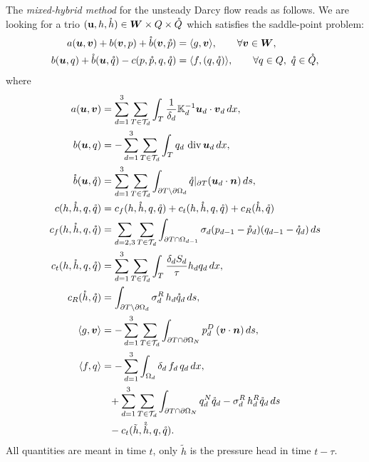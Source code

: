 The \emph{mixed-hybrid method} for the unsteady Darcy flow reads as follows.
We are looking for a trio $(\mathbf{u},h,\mathring h)  
\in \mathbf{\boldsymbol{W}}\times Q\times\mathring Q$ which satisfies the saddle-point problem:
\begin{align}
    a(\vc u,\vc v)  +b(\vc v, p) + \mr b(\vc v, \mr p)
        &=\langle g,\vc v \rangle, \qquad\forall \vc v\in \vc W,
        \label{eq:hybrid-frac-1}\\
    b(\vc u, q ) + \mr b( \vc u, \mr q) - c(p, \mr p, q, \mr q)
        &= \langle f, (q,\mr q) \rangle,
        \qquad\forall q\in Q,\ \mr q\in \mr Q, 
        \label{eq:hybrid-frac-2}
\end{align}
where
\begin{align}
    \label{eq:weak_term_a}
    a(\vc u, \vc v) &= \sum_{d=1}^{3}\sum_{T\in \mathcal T_d}
    \int_{T} \frac{1}{\delta_{d}}\tn K_{d}^{-1} 
    \vc u_d\cdot \vc v_d\,dx,
    \\
    \label{eq:weak_term_b}
    b(\vc u, q)  &= -\sum_{d=1}^{3}\sum_{T\in \mathcal T_d}
    \int_{T} q_d\,\div \vc u_d\,dx,
    \\
    \label{eq:weak_term_bf}
    \mr b(\vc u, \mr q)   &= \sum_{d=1}^{3}\sum_{T\in \mathcal T_d}
    \int_{\partial T\setminus\partial\Omega_{d}}
        \mr q|_{\partial T} ( \vc u_d\cdot\vc n)\,ds,
    \\
    \label{eq:weak_term c}
    c(h, \mr h, q, \mr q) &= c_f(h, \mr h, q, \mr q) 
    + c_t(h, \mr h, q, \mr q) + c_R(\mr h, \mr q)
    \\
    c_f(h, \mr h, q, \mr q)&=\sum_{d=2,3}\sum_{T\in \mathcal T_d}
        \int_{\partial T \cap\Omega_{d-1}} \sigma_{d} 
        (p_{d-1} - \mr p_d)(q_{d-1} - \mr q_d)\,ds
    \\
    c_t(h, \mr h, q, \mr q)&= \sum_{d=1}^{3}\sum_{T\in \mathcal T_d}
        \int_{T} \frac{\delta_d S_d}{\tau} h_d q_d\,dx,
    \\    
    c_R(\mr h, \mr q)&=
    \int_{\partial T\setminus\partial\Omega_{d}}
        \sigma_d^R\, h_d \mr q_d \,ds,
    \\
    \langle g, \vc v \rangle  & =
    -\sum_{d=1}^{3}\sum_{T\in\mathcal T_d}
    \int_{\partial T\cap\partial\Omega_N} 
        p_d^D\, (\vc v \cdot \vc n)  \,ds,
    \\
    \langle f, q \rangle  &=
    -\sum_{d=1}^{3}\int_{\Omega_d} \delta_{d}\,f_d\,q_{d}\,dx,
    \\
        &\phantom{=}+
    \sum_{d=1}^{3}\sum_{T\in\mathcal T_d}
    \int_{\partial T\cap\partial\Omega_N} 
        q_d^N \mr q_d - \sigma_d^R\, h_d^R \mr q_d\,ds
    \\
        &\phantom{=}-c_t(\tilde h, \mr{\tilde{h}}, q, \mr q).
    \label{eq:weak_term_f}%
\end{align}
All quantities are meant in time $t$, only $\tilde h$ is the pressure head in time $t-\tau$.


